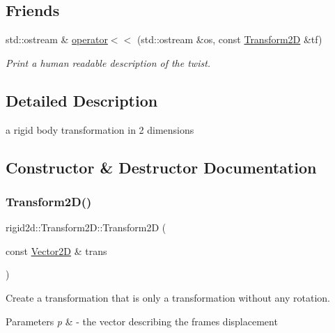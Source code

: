 \subsection*{Friends}
\begin{DoxyCompactItemize}
\item 
std\+::ostream \& \hyperlink{classrigid2d_1_1Transform2D_ad5239a3fa3a0f9cebd73c39f34c2075f}{operator$<$$<$} (std\+::ostream \&os, const \hyperlink{classrigid2d_1_1Transform2D}{Transform2D} \&tf)
\begin{DoxyCompactList}\small\item\em Print a human readable description of the twist. \end{DoxyCompactList}\end{DoxyCompactItemize}


\subsection{Detailed Description}
a rigid body transformation in 2 dimensions 

\subsection{Constructor \& Destructor Documentation}
\mbox{\label{classrigid2d_1_1Transform2D_ab3e595da2315ed50ba8eb24ead0c8d78}} 
\subsubsection{\texorpdfstring{Transform2\+D()}{Transform2D()}\hspace{0.1cm}{\footnotesize\ttfamily [1/4]}}
{\footnotesize\ttfamily rigid2d\+::\+Transform2\+D\+::\+Transform2D (\begin{DoxyParamCaption}\item[{const \hyperlink{structrigid2d_1_1Vector2D}{Vector2D} \&}]{trans }\end{DoxyParamCaption})\hspace{0.3cm}{\ttfamily [explicit]}}



Create a transformation that is only a transformation without any rotation. 


\begin{DoxyParams}{Parameters}
{\em p} & -\/ the vector describing the frame\textquotesingle{}s displacement \\
\hline
\end{DoxyParams}
\mbox{\label{classrigid2d_1_1Transform2D_a3f2f654cb039320e331931c0877b39a3}} 
